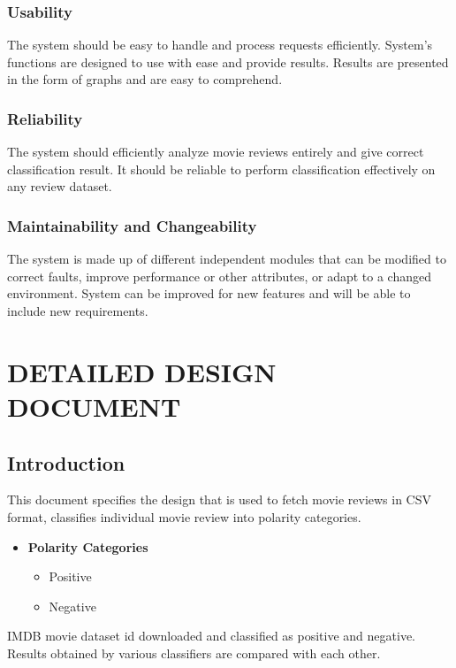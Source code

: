 \documentclass[oneside,a4paper,12pt]{pictreport}
\begin{document}
\subsection{Usability}
The system should be easy to handle and process requests efficiently. System's functions are designed to use with ease and provide results. Results are presented in the form of graphs and are easy to comprehend.

\subsection{Reliability}
The system should efficiently analyze movie reviews entirely and give correct classification result. It should be reliable to perform 
classification effectively on any review dataset.
\subsection{Maintainability and Changeability}
The system is made up of different independent modules that can be modified to correct faults, improve performance or other attributes, or adapt to a changed environment. System can be improved for new features and will be able to include new requirements.

\chapter{DETAILED DESIGN DOCUMENT}

\section{Introduction}
This document specifies the design that is used to fetch movie reviews in CSV format, classifies individual movie review into polarity categories.
\begin{itemize}
 


    \item \textbf{Polarity Categories}
    \begin{itemize}
    \item Positive
    \item Negative
   
    \end{itemize}
\end{itemize}
IMDB movie dataset id downloaded and classified as positive and negative.
Results obtained by various classifiers are compared with each other.
\newpage
\end{document}
